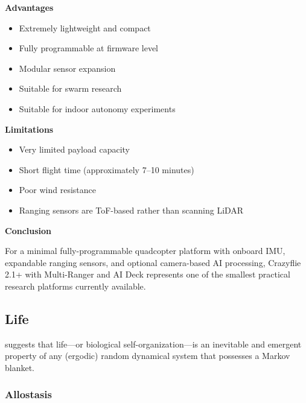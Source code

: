 \documentclass{book}
\providecommand{\ProjectDeepHeading}[2]{%
    \par\medskip\noindent\textbf{#2}\par\smallskip
}
\begin{document}
        \ProjectDeepHeading{6}{Advantages}
            
            \begin{itemize}
                \item Extremely lightweight and compact
                \item Fully programmable at firmware level
                \item Modular sensor expansion
                \item Suitable for swarm research
                \item Suitable for indoor autonomy experiments
            \end{itemize}
        
        \ProjectDeepHeading{6}{Limitations}
            
            \begin{itemize}
                \item Very limited payload capacity
                \item Short flight time (approximately 7–10 minutes)
                \item Poor wind resistance
                \item Ranging sensors are ToF-based rather than scanning LiDAR
            \end{itemize}
        
        \ProjectDeepHeading{6}{Conclusion}
            
            For a minimal fully-programmable quadcopter platform with onboard IMU, expandable ranging sensors, and optional camera-based AI processing, Crazyflie 2.1+ with Multi-Ranger and AI Deck represents one of the smallest practical research platforms currently available.

\subsection{Life}


\cite{friston-2013-life-as-we-know-it} suggests that life—or biological self-organization—is an inevitable and emergent property of any (ergodic) random dynamical system that possesses a Markov blanket.

\subsubsection{Allostasis}
\end{document}
